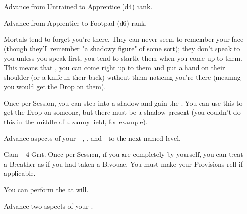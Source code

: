 \begin{multicols*}{2}


Advance  from Untrained to Apprentice (d4) rank.


Advance  from Apprentice to Footpad (d6) rank.



Mortals tend to forget you're there. They can never seem to remember your face (though they'll remember "a shadowy figure" of some sort); they don't speak to you unless you speak first, you tend to startle them when you come up to them. This means that , you can come right up to them and put a hand on their shoulder (or a knife in their back) without them noticing you're there (meaning you would get the Drop on them). 


Once per Session, you can step into a shadow and gain the .  You can use this to get the Drop on someone, but there must be a shadow present (you couldn't do this in the middle of a sunny field, for example).


Advance  aspects of your  - \DEATH, \INJURY, and \INSANITY - to the next named level. 

\newpage 


Gain +4 \MAX Grit. Once per Session, if you are completely by yourself, you can treat a Breather as if you had taken a Bivouac. You must make your Provisions roll if applicable. 


You can perform the  at will.


Advance two  aspects of your  \DCUP.



\end{multicols*}
